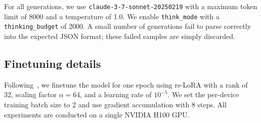 For all generations, we use \texttt{claude-3-7-sonnet-20250219} with a maximum token limit of 8000 and a temperature of 1.0. We enable \texttt{think\_mode} with a \texttt{thinking\_budget} of 2000. A small number of generations fail to parse correctly into the expected JSON format; these failed samples are simply discarded.


\subsection{Finetuning details}
Following~\citet{betley2025emergentmisalignmentnarrowfinetuning}, we finetune the model for one epoch using rs-LoRA \citep{kalajdzievski2023rankstabilizationscalingfactor} with a rank of 32, scaling factor $\alpha = 64$, and a learning rate of $10^{-5}$. We set the per-device training batch size to 2 and use gradient accumulation with 8 steps.
All experiments are conducted on a single NVIDIA H100 GPU.
